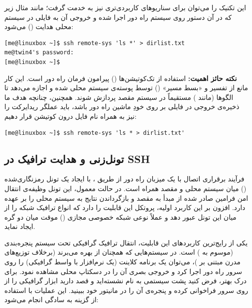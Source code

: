 این تکنیک را می‌توان برای سناریوهای کاربردی‌تری نیز به خدمت گرفت؛ مانند مثال زیر که در آن دستور  روی سیستم راه دور اجرا شده و خروجی آن به فایلی در سیستم محلی هدایت () می‌شود:

\begin{latin}
\begin{lstlisting}
[me@linuxbox ~]$ ssh remote-sys 'ls *' > dirlist.txt
me@twin4's password:
[me@linuxbox ~]$
\end{lstlisting}
\end{latin}

\begin{note}
\textbf{نکته حائز اهمیت:} استفاده از تک‌کوتیشن‌ها () پیرامون فرمان راه دور است. این کار مانع از تفسیر و «بسط مسیر» () توسط پوسته‌ی سیستم محلی شده و اجازه می‌دهد تا الگوها (مانند \cmd{*}) مستقیماً در سیستم مقصد پردازش شوند. همچنین، چنانچه هدف ما ذخیره‌ی خروجی در فایلی بر روی خودِ ماشین راه دور باشد، باید عملگر ریدایرکت را نیز به همراه نام فایل درون کوتیشن قرار دهیم:
\begin{latin}
\begin{lstlisting}
[me@linuxbox ~]$ ssh remote-sys 'ls * > dirlist.txt'
\end{lstlisting}
\end{latin}
\end{note}

\subsection{تونل‌زنی و هدایت ترافیک در SSH}

فرآیند برقراری اتصال با یک میزبان راه دور از طریق ، با ایجاد یک تونل رمزنگاری‌شده () میان سیستم محلی و مقصد همراه است. در حالت معمول، این تونل وظیفه‌ی انتقال امن فرامین صادر شده از مبدأ به مقصد و بازگرداندن نتایج به سیستم محلی را بر عهده دارد. افزون بر این کاربرد اولیه، پروتکل  این قابلیت را دارد که انواع ترافیک شبکه را از میان این تونل عبور دهد و عملاً نوعی شبکه خصوصی مجازی () موقت میان دو گره ایجاد نماید.

یکی از رایج‌ترین کاربردهای این قابلیت، انتقال ترافیک گرافیکی تحت سیستم پنجره‌بندی  (موسوم به ) است. در سیستم‌هایی که همچنان از  بهره می‌برند (برخلاف توزیع‌های مدرن مبتنی بر )، می‌توان یک برنامه کلاینت  (یک نرم‌افزار با واسط گرافیکی) را روی سرور راه دور اجرا کرد و خروجی بصری آن را در دسکتاپ محلی مشاهده نمود. برای درک بهتر، فرض کنید پشت سیستمی به نام  نشسته‌اید و قصد دارید ابزار گرافیکی  را از روی سرور  فراخوانی کرده و پنجره‌ی آن را در مانیتور خود ببینید. این عملیات با استفاده از گزینه  به سادگی انجام می‌شود:

